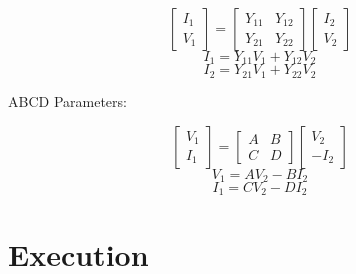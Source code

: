 \documentclass[12pt]{report}
\begin{document}
\begin{equation}
\begin{bmatrix}
I_1 \\ V_1
\end{bmatrix}
=
\begin{bmatrix}
Y_{11} & Y_{12} \\
Y_{21} & Y_{22} 
\end{bmatrix}
\begin{bmatrix}
I_2 \\ V_2
\end{bmatrix}
\end{equation}
$$ I_1 = Y_{11}V_1 + Y_{12}V_2 $$
$$ I_2 = Y_{21}V_1 + Y_{22}V_2 $$
\begin{center}
\large ABCD Parameters:\\
\end{center}
\begin{equation}
\begin{bmatrix}
V_1 \\ I_1
\end{bmatrix}
=
\begin{bmatrix}
A & B \\
C & D
\end{bmatrix}
\begin{bmatrix}
V_2 \\ -I_2
\end{bmatrix}
\end{equation}
$$ V_1 = AV_2 - BI_2 $$
$$ I_1 = CV_2 - DI_2 $$


\chapter{Execution}
\end{document}
